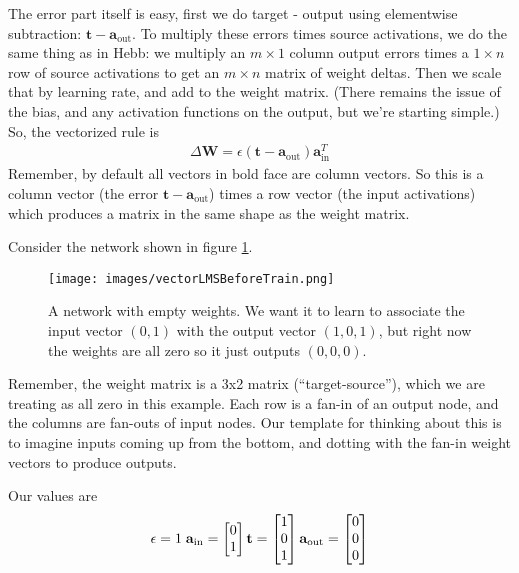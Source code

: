 The error part itself is easy, first we do target - output using elementwise subtraction: $\mathbf{t} - \mathbf{a}_{\text{out}}$. To multiply these errors times source activations, we do the same thing as in Hebb: we multiply an $m \times  1$ column output errors times a $1 \times  n$ row of source activations to get an $m \times n$ matrix of weight deltas. Then we scale that by learning rate, and add to the weight matrix. (There remains the issue of the bias, and any activation functions on the output, but we're starting simple.) So, the vectorized rule is
\begin{eqnarray}\label{vectorizedLMS}
\Delta \mathbf{W}  =  \epsilon (\mathbf{t} - \mathbf{a}_{\text{out}}) \mathbf{a}_{\text{in}}^T
\end{eqnarray}
Remember, by default all vectors in bold face are column vectors. So this is a column vector (the error $\mathbf{t} - \mathbf{a}_{\text{out}}$) times a row vector (the input activations) which produces a matrix in the same shape as the weight matrix.

Consider the network shown in figure \ref{lms_vector_pre}.

\begin{figure}[h]
\centering
\texttt{[image: images/vectorLMSBeforeTrain.png]}
\caption[Jeff Yoshimi.]{A network with empty weights. We want it to learn to associate the input vector $(0,1)$ with the output vector $(1,0,1)$, but right now the weights are all zero so it just outputs $(0,0,0)$. }
\label{lms_vector_pre}
\end{figure}

Remember, the weight matrix is a 3x2 matrix  (``target-source''), which we are treating as all zero in this example. Each row is a fan-in of an output node, and the columns are fan-outs of input nodes. Our template for thinking about this is to imagine inputs coming up from the bottom, and dotting with the fan-in weight vectors to produce outputs.

Our values are
\begin{equation*}
\epsilon = 1 \; \; \\
\mathbf{a}_{\text{in}} = \begin{bmatrix} 0 \\ 1 \end{bmatrix} \\
\mathbf{t} = \begin{bmatrix} 1 \\ 0 \\ 1 \end{bmatrix} \\
\mathbf{a}_{\text{out}} = \begin{bmatrix} 0 \\ 0 \\ 0 \end{bmatrix}
\end{equation*}

